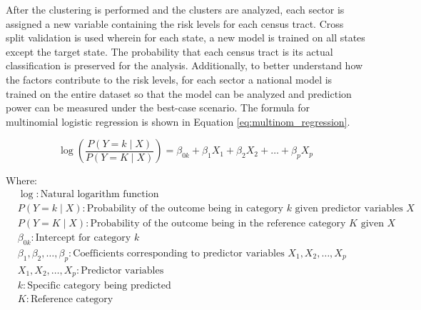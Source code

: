 After the clustering is performed and the clusters are analyzed, each sector is assigned a new variable containing the risk levels for each census tract. Cross split validation is used wherein for each state, a new model is trained on all states except the target state. The probability that each census tract is its actual classification is preserved for the analysis. Additionally, to better understand how the \hs factors contribute to the risk levels, for each sector a national model is trained on the entire dataset so that the model can be analyzed and prediction power can be measured under the best-case scenario. The formula for multinomial logistic regression is shown in Equation \ref{eq:multinom_regression}.

\begin{equation}\label{eq:multinom_regression}
    \log\left(\frac{{P(Y = k \mid X)}}{{P(Y = K \mid X)}}\right) = \beta_{0k} + \beta_1 X_1 + \beta_2 X_2 + \dots + \beta_p X_p
\end{equation}

Where:
\begin{align*}
    & \log: \text{Natural logarithm function} \\
    & P(Y = k \mid X): \text{Probability of the outcome being in category \(k\) given predictor variables \(X\)} \\
    & P(Y = K \mid X): \text{Probability of the outcome being in the reference category \(K\) given \(X\)} \\
    & \beta_{0k}: \text{Intercept for category \(k\)} \\
    & \beta_1, \beta_2, \dots, \beta_p: \text{Coefficients corresponding to predictor variables \(X_1, X_2, \dots, X_p\)} \\
    & X_1, X_2, \dots, X_p: \text{Predictor variables} \\
    & k: \text{Specific category being predicted} \\
    & K: \text{Reference category}
\end{align*}

\endinput